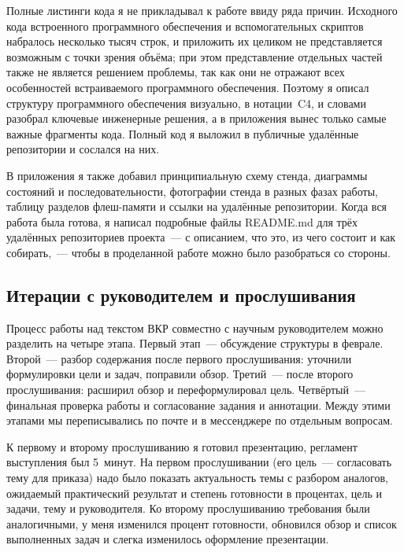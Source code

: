 Полные листинги кода я не прикладывал к работе ввиду ряда причин.
Исходного кода встроенного программного обеспечения и вспомогательных
скриптов набралось несколько тысяч строк, и приложить их целиком не
представляется возможным с точки зрения объёма; при этом представление
отдельных частей также не является решением проблемы, так как они не
отражают всех особенностей встраиваемого программного обеспечения.
Поэтому я описал структуру программного обеспечения визуально, в
нотации~C4, и словами разобрал ключевые инженерные решения, а в
приложения вынес только самые важные фрагменты кода. Полный код я
выложил в публичные удалённые репозитории и сослался на них.

В приложения я также добавил принципиальную схему стенда, диаграммы
состояний и последовательности, фотографии стенда в разных фазах
работы, таблицу разделов флеш-памяти и ссылки на удалённые репозитории.
Когда вся работа была готова, я написал подробные файлы README.md для
трёх удалённых репозиториев проекта~--- с описанием, что это, из чего
состоит и как собирать,~--- чтобы в проделанной работе можно было
разобраться со стороны.

\subsection{Итерации с руководителем и прослушивания}

Процесс работы над текстом ВКР совместно с научным руководителем можно
разделить на четыре этапа. Первый этап~--- обсуждение структуры в
феврале. Второй~--- разбор содержания после первого прослушивания:
уточнили формулировки цели и задач, поправили обзор. Третий~--- после
второго прослушивания: расширил обзор и переформулировал цель.
Четвёртый~--- финальная проверка работы и согласование задания и
аннотации. Между этими этапами мы переписывались по почте и в
мессенджере по отдельным вопросам.

К первому и второму прослушиванию я готовил презентацию, регламент
выступления был 5~минут. На первом прослушивании (его цель~---
согласовать тему для приказа) надо было показать актуальность темы с
разбором аналогов, ожидаемый практический результат и степень
готовности в процентах, цель и задачи, тему и руководителя. Ко второму
прослушиванию требования были аналогичными, у меня изменился процент
готовности, обновился обзор и список выполненных задач и слегка
изменилось оформление презентации.

